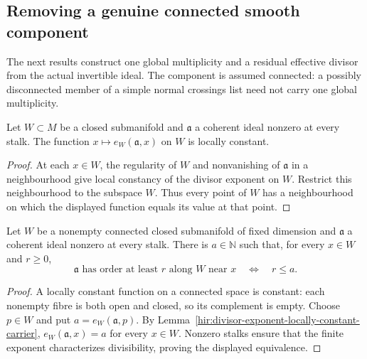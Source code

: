 \subsection{Removing a genuine connected smooth component}

The next results construct one global multiplicity and a residual
effective divisor from the actual invertible ideal. The component is
assumed connected: a possibly disconnected member of a simple normal
crossings list need not carry one global multiplicity.

\begin{lemma}
\label{hir:divisor-exponent-locally-constant-carrier}
\leanok
Let $W\subset M$ be a closed submanifold and $\mathfrak a$ a coherent
ideal nonzero at every stalk. The function
$x\mapsto e_W(\mathfrak a,x)$ on $W$ is locally constant.
\end{lemma}
\begin{proof}
At each $x\in W$, the regularity of $W$ and nonvanishing of
$\mathfrak a$ in a neighbourhood give local constancy of the divisor
exponent on $W$. Restrict this neighbourhood to the subspace $W$.
Thus every point of $W$ has a neighbourhood on which the displayed
function equals its value at that point.
\end{proof}

\begin{lemma}
\label{hir:divisor-exponent-connected-carrier}
\leanok
Let $W$ be a nonempty connected closed submanifold of fixed dimension
and $\mathfrak a$ a coherent ideal nonzero at every stalk. There is
$a\in\mathbb N$ such that, for every $x\in W$ and $r\geq0$,
\[
 \mathfrak a\text{ has order at least }r\text{ along }W
 \text{ near }x \quad\Longleftrightarrow\quad r\leq a.
\]
\end{lemma}
\begin{proof}
A locally constant function on a connected space is constant: each
nonempty fibre is both open and closed, so its complement is empty.
Choose $p\in W$ and put $a=e_W(\mathfrak a,p)$. By
Lemma~\ref{hir:divisor-exponent-locally-constant-carrier},
$e_W(\mathfrak a,x)=a$ for every $x\in W$. Nonzero stalks ensure
that the finite exponent characterizes divisibility, proving the
displayed equivalence.
\end{proof}

